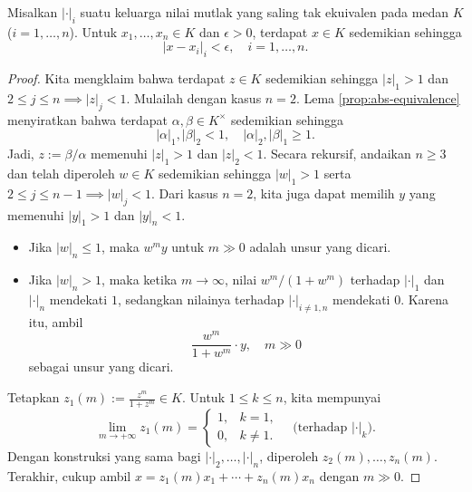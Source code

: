 \begin{theorem}\label{prop:AW-approx}
	Misalkan $|\cdot|_i$ suatu keluarga nilai mutlak yang saling tak ekuivalen pada medan $K$ ($i=1,\ldots,n$). Untuk $x_1, \ldots, x_n \in K$ dan $\epsilon > 0$, terdapat $x \in K$ sedemikian sehingga
	\[ |x-x_i|_i  < \epsilon, \quad i=1,\ldots,n. \]
\end{theorem}
\begin{proof}
	Kita mengklaim bahwa terdapat $z \in K$ sedemikian sehingga $|z|_1 > 1$ dan $2 \leq j \leq n \implies |z|_j < 1$. Mulailah dengan kasus $n=2$. Lema \ref{prop:abs-equivalence} menyiratkan bahwa terdapat $\alpha, \beta \in K^\times$ sedemikian sehingga
	\[ |\alpha|_1, |\beta|_2 < 1, \quad |\alpha|_2, |\beta|_1 \geq 1. \]
	Jadi, $z := \beta/\alpha$ memenuhi $|z|_1 > 1$ dan $|z|_2 < 1$. Secara rekursif, andaikan $n \geq 3$ dan telah diperoleh $w \in K$ sedemikian sehingga $|w|_1 > 1$ serta $2 \leq j \leq n-1 \implies |w|_j < 1$. Dari kasus $n=2$, kita juga dapat memilih $y$ yang memenuhi $|y|_1 > 1$ dan $|y|_n < 1$.
	\begin{itemize}
		\item Jika $|w|_n \leq 1 $, maka $w^m y$ untuk $m \gg 0$ adalah unsur yang dicari.
		\item Jika $|w|_n > 1$, maka ketika $m \to \infty$, nilai $w^m/(1+w^m)$ terhadap $|\cdot|_1$ dan $|\cdot|_n$ mendekati $1$, sedangkan nilainya terhadap $|\cdot|_{i \neq 1,n}$ mendekati $0$. Karena itu, ambil
			\[ \frac{w^m}{1+w^m} \cdot y, \quad m \gg 0\]
			sebagai unsur yang dicari.
	\end{itemize}
	Tetapkan $z_1(m) := \frac{z^m}{1+z^m} \in K$. Untuk $1 \leq k \leq n$, kita mempunyai
	\[ \lim_{m \to +\infty} z_1(m) = \begin{cases}
		1, & k = 1, \\
		0, & k \neq 1.
	\end{cases} \quad \text{(terhadap $|\cdot|_k$)}. \]
	Dengan konstruksi yang sama bagi $|\cdot|_2, \ldots, |\cdot|_n$, diperoleh $z_2(m), \ldots, z_n(m)$. Terakhir, cukup ambil $x = z_1(m) x_1 + \cdots + z_n(m) x_n$ dengan $m \gg 0$.
\end{proof}

